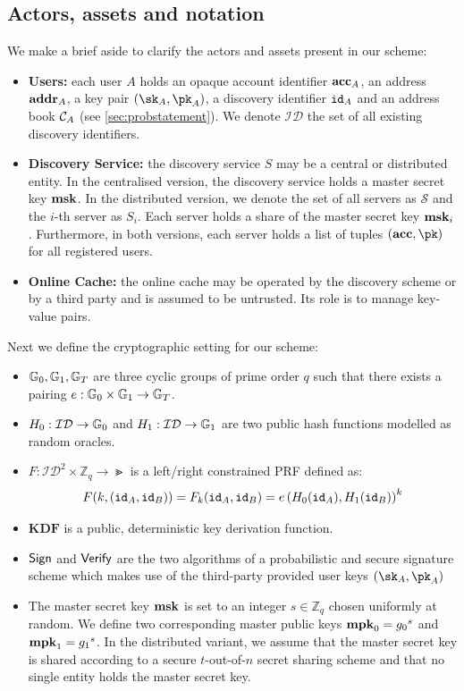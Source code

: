 	\subsection{Actors, assets and notation}
	
		\noindent We make a brief aside to clarify the actors and assets present in our scheme:		
		\begin{itemize}
			\item \textbf{Users:} each user $A$ holds an opaque account identifier $\mathbf{acc}_A$, an address $\mathbf{addr}_A$, a key pair $(\sk_A,\pk_A)$, a discovery identifier $\mathtt{id}_A$ and an address book $\mathcal{C}_{A}$ (see \autoref{sec:probstatement}). We denote $\mathcal{ID}$ the set of all existing discovery identifiers.
			\item \textbf{Discovery Service:} the discovery service $S$ may be a central or distributed entity. In the centralised version, the discovery service holds a master secret key $\mathbf{msk}$. In the distributed version, we denote the set of all servers as $\mathcal{S}$ and the $i$-th server as $S_i$. Each server holds a share of the master secret key $\mathbf{msk}_i$. Furthermore, in both versions, each server holds a list of tuples $(\acc, \pk)$ for all registered users.
			\item \textbf{Online Cache:} the online cache may be operated by the discovery scheme or by a third party and is assumed to be untrusted. Its role is to manage key-value pairs.
			
			\end{itemize}
			
		\noindent Next we define the cryptographic setting for our scheme:
		\begin{itemize}
			\item $\mathbb{G}_0, \mathbb{G}_1, \mathbb{G}_T$ are three cyclic groups of prime order $q$ such that there exists a pairing $e : \mathbb{G}_0 \times \mathbb{G}_1 \rightarrow \mathbb{G}_T$.
			\item $H_0: \mathcal{ID}\rightarrow \mathbb{G}_0$  and $H_1: \mathcal{ID} \rightarrow \mathbb{G}_1$ are two public hash functions modelled as random oracles.
			\item $F: \mathcal{ID}^2 \times \mathbb{Z}_q \rightarrow \Gt$ is a left/right constrained PRF defined as: \begin{equation}
				F(k, (\mathtt{id}_A, \mathtt{id}_B)) = F_k(\mathtt{id}_A, \mathtt{id}_B)= e\left(H_0(\mathtt{id}_A), H_1(\mathtt{id}_B) \right)^k
			\end{equation}
			\item $\mathbf{KDF}$ is a public, deterministic key derivation function.
			\item $\mathsf{Sign}$ and $\mathsf{Verify}$ are the two algorithms of a probabilistic and secure signature scheme which makes use of the third-party provided user keys $(\sk_A,\pk_A)$ 
			\item The master secret key $\mathbf{msk}$ is set to an integer $s \in \mathbb{Z}_q$ chosen uniformly at random. We define two corresponding master public keys $\mathbf{mpk}_0 = {g_0}^s$ and $\mathbf{mpk}_1 = {g_1}^s$. In the distributed variant, we assume that the master secret key is shared according to a secure $t$-out-of-$n$ secret sharing scheme and that no single entity holds the master secret key.
		\end{itemize}

